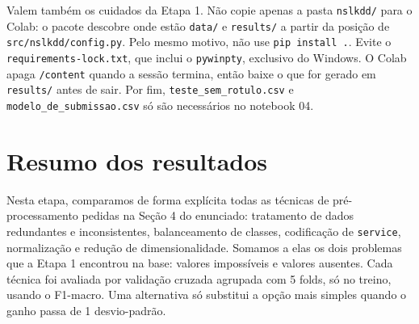 \documentclass[11pt,a4paper]{article}
\begin{document}
Valem também os cuidados da Etapa 1. Não copie apenas a pasta \texttt{nslkdd/} para o Colab: o pacote descobre onde estão \texttt{data/} e \texttt{results/} a partir da posição de \texttt{src/nslkdd/config.py}. Pelo mesmo motivo, não use \texttt{pip install .}. Evite o \texttt{requirements-lock.txt}, que inclui o \texttt{pywinpty}, exclusivo do Windows. O Colab apaga \texttt{/content} quando a sessão termina, então baixe o que for gerado em \texttt{results/} antes de sair. Por fim, \texttt{teste\_sem\_rotulo.csv} e \texttt{modelo\_de\_submissao.csv} só são necessários no notebook 04.

\section*{Resumo dos resultados}

Nesta etapa, comparamos de forma explícita todas as técnicas de pré-processamento pedidas na Seção 4 do enunciado: tratamento de dados redundantes e inconsistentes, balanceamento de classes, codificação de \texttt{service}, normalização e redução de dimensionalidade. Somamos a elas os dois problemas que a Etapa 1 encontrou na base: valores impossíveis e valores ausentes. Cada técnica foi avaliada por validação cruzada agrupada com 5 folds, só no treino, usando o F1-macro. Uma alternativa só substitui a opção mais simples quando o ganho passa de 1 desvio-padrão.
\end{document}
